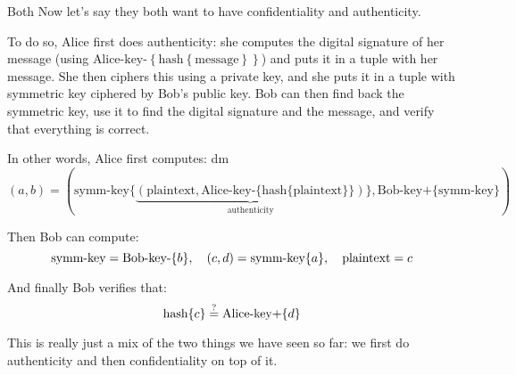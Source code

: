 \documentclass[a4paper]{article}
\begin{document}
\begin{parag}{Both}
    Now let's say they both want to have confidentiality and authenticity. 

    To do so, Alice first does authenticity: she computes the digital signature of her message (using $\text{Alice-key-}\left\{\text{hash}\left\{\text{message}\right\}\right\}$) and puts it in a tuple with her message. She then ciphers this using a private key, and she puts it in a tuple with symmetric key ciphered by Bob's public key. Bob can then find back the symmetric key, use it to find the digital signature and the message, and verify that everything is correct.

    In other words, Alice first computes: dm 
    \[(a, b) = (\text{symm-key}\{\underbrace{(\text{plaintext}, \text{Alice-key-}\{\text{hash}\{\text{plaintext}\}\})}_{\text{authenticity}}\}, \text{Bob-key+}\{\text{symm-key}\})\]
    
    Then Bob can compute: 
    \[\text{symm-key} = \text{Bob-key-}\left\{b\right\}, \mathspace \left(c, d\right) = \text{symm-key}\left\{a\right\}, \mathspace \text{plaintext} = c\]
    
    And finally Bob verifies that: 
    \[\text{hash}\left\{c\right\} \over{=}{?} \text{Alice-key+}\left\{d\right\}\]

    This is really just a mix of the two things we have seen so far: we first do authenticity and then confidentiality on top of it.
\end{parag}
\end{document}
